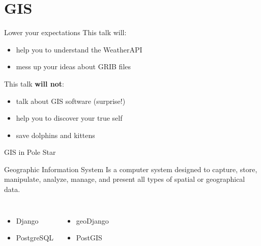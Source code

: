 \documentclass[xcolor=svgnames]{beamer}
\begin{document}
\section{GIS}

    \begin{frame}{Lower your expectations}
        \pause
        This talk will:
        \begin{itemize}
            \item help you to understand the WeatherAPI
            \pause
            \item mess up your ideas about GRIB files
        \end{itemize}
        \pause
        \vspace{0.05\textwidth}
        This talk \textbf{will not}:
        \begin{itemize}
            \item talk about GIS software (surprise!)
            \pause
            \item help you to discover your true self
            \pause
            \item save dolphins and kittens
        \end{itemize}
    \end{frame}

    \begin{frame}{GIS in Pole Star}
        \begin{center}
            \color{black}
            \begin{block}{Geographic Information System}
                Is a computer system designed to capture, store, manipulate, analyze, manage, and present all types of spatial or geographical data.
            \end{block}
        \end{center}
        \vspace{0.05\textheight}
        \begin{columns}[c]
                \begin{itemize}
                    \item<2-> Django
                    \item<3-> PostgreSQL
                \end{itemize}
                \begin{itemize}
                    \item<2-> geoDjango
                    \item<3-> PostGIS
                \end{itemize}
        \end{columns}
    \end{frame}
\end{document}
